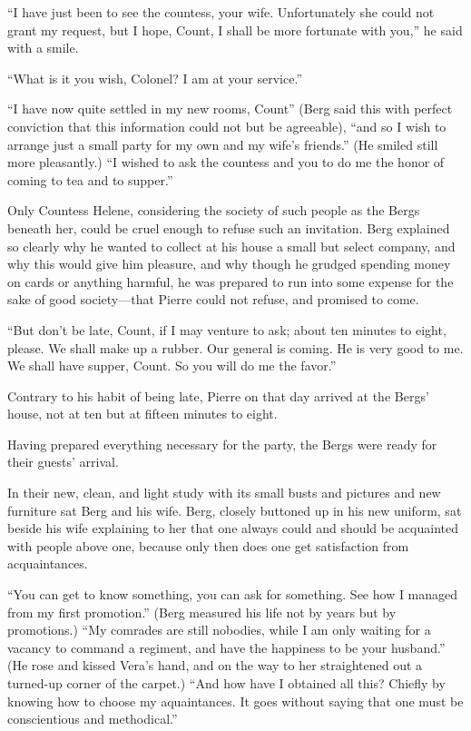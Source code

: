 ``I have just been to see the countess, your wife. Unfortunately
she could not grant my request, but I hope, Count, I shall be
more fortunate with you,'' he said with a smile.

``What is it you wish, Colonel? I am at your service.''

``I have now quite settled in my new rooms, Count'' (Berg said
this with perfect conviction that this information could not but
be agreeable), ``and so I wish to arrange just a small party for
my own and my wife's friends.'' (He smiled still more
pleasantly.) ``I wished to ask the countess and you to do me the
honor of coming to tea and to supper.''

Only Countess Helene, considering the society of such people as
the Bergs beneath her, could be cruel enough to refuse such an
invitation.  Berg explained so clearly why he wanted to collect
at his house a small but select company, and why this would give
him pleasure, and why though he grudged spending money on cards
or anything harmful, he was prepared to run into some expense for
the sake of good society---that Pierre could not refuse, and
promised to come.

``But don't be late, Count, if I may venture to ask; about ten
minutes to eight, please. We shall make up a rubber. Our general
is coming. He is very good to me. We shall have supper, Count. So
you will do me the favor.''

Contrary to his habit of being late, Pierre on that day arrived
at the Bergs' house, not at ten but at fifteen minutes to eight.

Having prepared everything necessary for the party, the Bergs
were ready for their guests' arrival.

In their new, clean, and light study with its small busts and
pictures and new furniture sat Berg and his wife. Berg, closely
buttoned up in his new uniform, sat beside his wife explaining to
her that one always could and should be acquainted with people
above one, because only then does one get satisfaction from
acquaintances.

``You can get to know something, you can ask for something. See
how I managed from my first promotion.'' (Berg measured his life
not by years but by promotions.) ``My comrades are still
nobodies, while I am only waiting for a vacancy to command a
regiment, and have the happiness to be your husband.'' (He rose
and kissed Vera's hand, and on the way to her straightened out a
turned-up corner of the carpet.) ``And how have I obtained all
this? Chiefly by knowing how to choose my aquaintances. It goes
without saying that one must be conscientious and methodical.''

